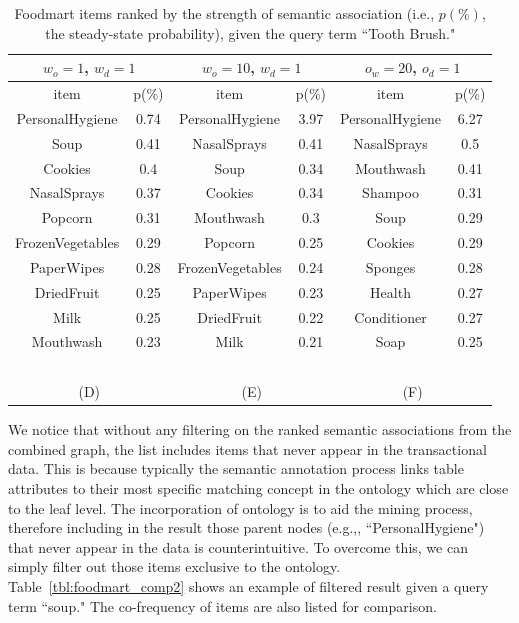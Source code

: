 \begin{table}[tbh]
\begin{center}
\begin{tabular}{ c c | c c | c c }
\hline
\multicolumn{2}{c|}{$w_o=1$, $w_d=1$}&\multicolumn{2}{c|}{$w_o=10$, $w_d=1$}&\multicolumn{2}{c}{$o_w=20$, $o_d=1$}\\
\hline
item	&	p(\%)	&	item	&	p(\%)	&	item	&	p(\%)	\\
				\hline							
PersonalHygiene	&	0.74	&	PersonalHygiene	&	3.97	&	PersonalHygiene	&	6.27	\\
Soup	&	0.41	&	NasalSprays	&	0.41	&	NasalSprays	&	0.5	\\
Cookies	&	0.4	&	Soup	&	0.34	&	Mouthwash	&	0.41	\\
NasalSprays	&	0.37	&	Cookies	&	0.34	&	Shampoo	&	0.31	\\
Popcorn	&	0.31	&	Mouthwash	&	0.3	&	Soup	&	0.29	\\
FrozenVegetables	&	0.29	&	Popcorn	&	0.25	&	Cookies	&	0.29	\\
PaperWipes	&	0.28	&	FrozenVegetables	&	0.24	&	Sponges	&	0.28	\\
DriedFruit	&	0.25	&	PaperWipes	&	0.23	&	Health	&	0.27	\\
Milk	&	0.25	&	DriedFruit	&	0.22	&	Conditioner	&	0.27	\\
Mouthwash	&	0.23	&	Milk	&	0.21	&	Soap	&	0.25	\\
\hline
\multicolumn{4}{c}{~}\\
\multicolumn{2}{c}{(D)}  &  \multicolumn{2}{c}{(E)}  & \multicolumn{2}{c}{(F)}\\
\end{tabular}
\end{center}
\caption[Top results on the Foodmart dataset]{\label{tbl:foodmart_comp} Foodmart items ranked by the strength of semantic association  (i.e., $p(\%)$, the steady-state probability), given the query term ``Tooth Brush."}
\end{table}

We notice that without any filtering on the ranked semantic associations from the combined graph, the list includes items that never appear in the transactional data. This is because typically the semantic annotation process links table attributes to their most specific matching concept in the ontology which are close to the leaf level. The incorporation of ontology is to aid the mining process, therefore including in the result those parent nodes (e.g.,, ``PersonalHygiene") that never appear in the data is counterintuitive. To overcome this, we can simply filter out those items exclusive to the ontology. Table~\ref{tbl:foodmart_comp2} shows an example of filtered result given a query term ``soup." The co-frequency of items are also listed for comparison.

